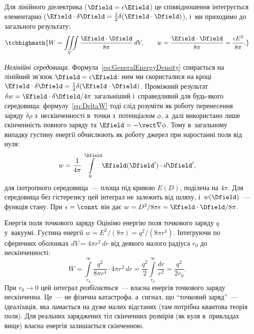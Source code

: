 Для лінійного діелектрика ($\Dfield = \epsilon\Efield$) це співвідношення інтегрується
елементарно ($\Efield\cdot\delta\Dfield = \tfrac12\delta(\Efield\cdot\Dfield)$), і~ми
приходимо до загального результату:
\begin{equation}\label{eq:GeneralEnergyDensity}
	\tcbhighmath{
		W = \iiint\limits_V \frac{\Efield\cdot\Dfield}{8\pi}\, dV, \qquad w = \frac{\Efield\cdot\Dfield}{8\pi} = \frac{\epsilon E^2}{8\pi}.
	}
\end{equation}

\begin{Extra}
\emph{Нелінійні середовища\ExtraMark.} Формула~\eqref{eq:GeneralEnergyDensity} спирається на лінійний
зв'язок $\Dfield=\epsilon\Efield$: ним ми скористалися на кроці
$\Efield\cdot\delta\Dfield=\tfrac12\delta(\Efield\cdot\Dfield)$. Проміжний результат
$\delta w = \Efield\cdot\delta\Dfield/4\pi$ загальніший і~справедливий для будь-якого
середовища: формулу~\eqref{eq:DeltaW} тоді слід розуміти як роботу перенесення заряду
$\delta\rho$ з~нескінченності в~точки з~потенціалом $\phi$, а~далі використано лише
скінченність повного заряду та $\Efield=-\vect\nabla\phi$. Тому в~загальному випадку густину
енергії обчислюють як роботу джерел при наростанні поля від нуля:
\begin{equation*}
	w = \frac1{4\pi}\int\limits_0^{\Dfield} \Efield(\Dfield')\cdot d\Dfield',
\end{equation*}
для ізотропного середовища~--- площа під кривою $E(D)$, поділена на $4\pi$. Для середовища
без гістерезису цей інтеграл не залежить від шляху, і~$w(\Dfield)$~--- функція стану. При
$\epsilon=\const$ він дає $w = D^2/8\pi\epsilon = \Efield\cdot\Dfield/8\pi$.
\end{Extra}

\begin{Example}[unbreakable]{Енергія поля точкового заряду}
     Оцінімо енергію поля точкового заряду $q$ у~вакуумі. Густина енергії $w = E^2/(8\pi)
     = q^2/(8\pi r^4)$. Інтегруючи по сферичних оболонках $dV = 4\pi r^2\, dr$ від деякого
     малого радіуса $r_0$ до нескінченності:
	\begin{equation*}
		W = \int\limits_{r_0}^{\infty} \frac{q^2}{8\pi r^4}\cdot 4\pi r^2\, dr = \frac{q^2}{2}\int\limits_{r_0}^{\infty} \frac{dr}{r^2} = \frac{q^2}{2r_0}.
	\end{equation*}
	При $r_0 \to 0$ цей інтеграл \emph{розбігається}~--- власна енергія точкового заряду
	нескінченна. Це~--- не фізична катастрофа, а~сигнал, що \enquote{точковий заряд}~---
	ідеалізація, яка ламається на дуже малих відстанях (там потрібна квантова теорія
	поля). Для реальних заряджених тіл скінченних розмірів (як куля в~прикладах вище)
	власна енергія залишається скінченною.
\end{Example}



